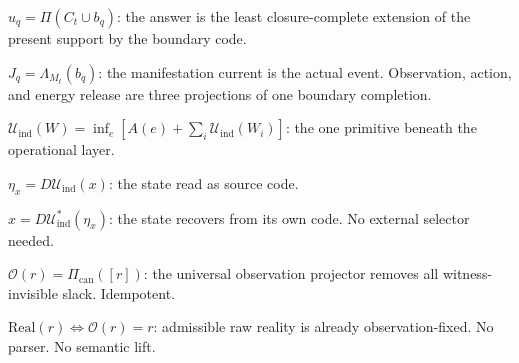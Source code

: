\begin{theorem}
\label{thm:step36}
$u_q = \Pi(C_t \cup b_q)$: the answer is the least closure-complete
extension of the present support by the boundary code.
\end{theorem}

\begin{theorem}
\label{thm:step37}
$J_q = \Lambda_{M_t}(b_q)$: the manifestation current is the actual event.
Observation, action, and energy release are three projections of one
boundary completion.
\end{theorem}

\begin{theorem}
\label{thm:step38}
$\mathcal{U}_{\mathrm{ind}}(W) = \inf_e[A(e) + \sum_i
\mathcal{U}_{\mathrm{ind}}(W_i)]$: the one primitive beneath the
operational layer.
\end{theorem}

\begin{theorem}
\label{thm:step39}
$\eta_x = D\mathcal{U}_{\mathrm{ind}}(x)$: the state read as source code.
\end{theorem}

\begin{theorem}
\label{thm:step40}
$x = D\mathcal{U}_{\mathrm{ind}}^*(\eta_x)$: the state recovers from
its own code.  No external selector needed.
\end{theorem}

\begin{theorem}
\label{thm:step41}
$\mathcal{O}(r) = \Pi_{\mathrm{can}}([r])$: the universal observation
projector removes all witness-invisible slack.  Idempotent.
\end{theorem}

\begin{theorem}
\label{thm:step42}
$\mathrm{Real}(r) \iff \mathcal{O}(r) = r$: admissible raw reality is
already observation-fixed.  No parser.  No semantic lift.
\end{theorem}

